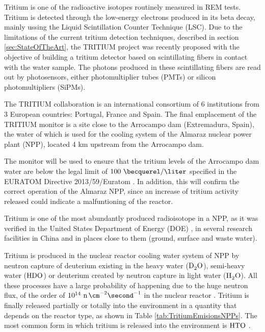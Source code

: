Tritium is one of the radioactive isotopes routinely measured in REM tests. Tritium is detected through the low-energy electrons produced in its beta decay, mainly ussing the Liquid Scintillation Counter Technique (LSC). Due to the limitations of the current tritium detection techniques, described in section \ref{sec:StateOfTheArt}, the TRITIUM project was recently proposed with the objective of building a tritium detector based on scintillating fibers in contact with the water sample. The photons produced in these scintillating fibers are read out by photosensors, either photomultiplier tubes (PMTs) or silicon photomultipliers (SiPMs). 

The TRITIUM collaboration is an international consortium of 6 institutions from 3 European countries: Portugal, France and Spain. The final emplacement of the TRITIUM monitor is a site close to the Arrocampo dam (Extremadura, Spain), the water of which is used for the cooling system of the Almaraz nuclear power plant (NPP), located 4 km upstream from the Arrocampo dam.

The monitor will be used to ensure that the tritium levels of the Arrocampo dam  water are below the legal limit of $100~\becquerel/\liter$ specified in the EURATOM Directive 2013/59/Euratom \cite{100BqL}. In addition, this will confirm the correct operation of the Almaraz NPP, since an increase of tritium activity released could indicate a malfuntioning of the reactor.

Tritium is one of the most abundantly produced radioisotope in a NPP, as it was verified in the United States Department of Energy (DOE) \cite{FiberDetector1a, FiberDetector1b}, in several research facilities in China \cite{CommonEmissionTritium} and in places close to them (ground, surface and waste water).

Tritium is produced in the nuclear reactor cooling water system of NPP by neutron capture of deuterium existing in the heavy water ($\ce{D_2 O}$), semi-heavy water ($\ce{H D O}$) or deuterium created by neutron capture in light water ($\ce{H_2 O}$). All these processes have a large probability of happening due to the huge neutron flux, of the order of $10^{14} ~\ce{n} \, \cm^{-2} \second^{-1}$ in the nuclear reactor \cite{CrossSeccionNeutrons}. Tritium is finally released partially or totally into the environment in a quantity that depends on the reactor type, as shown in Table \ref{tab:TritiumEmisionsNPPs}. The most common form in which tritium is released into the environment is $\ce{HTO}$ \cite{CommonEmissionTritium}.

